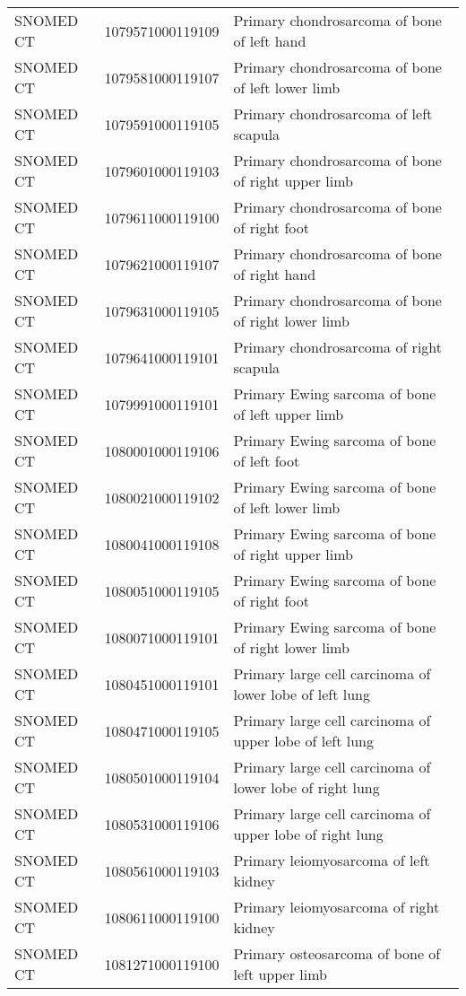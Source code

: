 \begin{longtable}{p{}p{}p{}}
  SNOMED CT & 1079571000119109 & Primary chondrosarcoma of bone of left hand \\ 
  SNOMED CT & 1079581000119107 & Primary chondrosarcoma of bone of left lower limb \\ 
  SNOMED CT & 1079591000119105 & Primary chondrosarcoma of left scapula \\ 
  SNOMED CT & 1079601000119103 & Primary chondrosarcoma of bone of right upper limb \\ 
  SNOMED CT & 1079611000119100 & Primary chondrosarcoma of bone of right foot \\ 
  SNOMED CT & 1079621000119107 & Primary chondrosarcoma of bone of right hand \\ 
  SNOMED CT & 1079631000119105 & Primary chondrosarcoma of bone of right lower limb \\ 
  SNOMED CT & 1079641000119101 & Primary chondrosarcoma of right scapula \\ 
  SNOMED CT & 1079991000119101 & Primary Ewing sarcoma of bone of left upper limb \\ 
  SNOMED CT & 1080001000119106 & Primary Ewing sarcoma of bone of left foot \\ 
  SNOMED CT & 1080021000119102 & Primary Ewing sarcoma of bone of left lower limb \\ 
  SNOMED CT & 1080041000119108 & Primary Ewing sarcoma of bone of right upper limb \\ 
  SNOMED CT & 1080051000119105 & Primary Ewing sarcoma of bone of right foot \\ 
  SNOMED CT & 1080071000119101 & Primary Ewing sarcoma of bone of right lower limb \\ 
  SNOMED CT & 1080451000119101 & Primary large cell carcinoma of lower lobe of left lung \\ 
  SNOMED CT & 1080471000119105 & Primary large cell carcinoma of upper lobe of left lung \\ 
  SNOMED CT & 1080501000119104 & Primary large cell carcinoma of lower lobe of right lung \\ 
  SNOMED CT & 1080531000119106 & Primary large cell carcinoma of upper lobe of right lung \\ 
  SNOMED CT & 1080561000119103 & Primary leiomyosarcoma of left kidney \\ 
  SNOMED CT & 1080611000119100 & Primary leiomyosarcoma of right kidney \\ 
  SNOMED CT & 1081271000119100 & Primary osteosarcoma of bone of left upper limb \\ 

\end{longtable}
